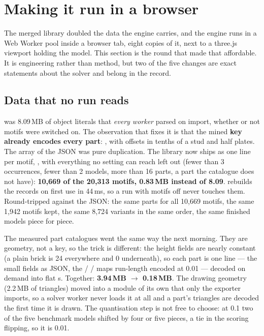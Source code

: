 \section{Making it run in a browser}\label{sec:fast}
The merged library doubled the data the engine carries, and the engine runs in a Web Worker pool inside a browser tab, eight
copies of it, next to a three.js viewport holding the model. This section is the round that made that affordable. It is
engineering rather than method, but two of the five changes are exact statements about the solver and belong in the record.

\subsection{Data that no run reads}
 was 8.09\,MB of object literals that \emph{every worker} parsed on import, whether or not motifs were switched on.
The observation that fixes it is that the mined \textbf{key already encodes every part}: , with
offsets in tenths of a stud and half plates. The  array of the JSON was pure duplication. The library now ships as one
line per motif, , with everything no setting can reach left out (fewer than 3
occurrences, fewer than 2 models, more than 16 parts, a part the catalogue does not have): \textbf{10,669 of the 20,313 motifs,
0.83\,MB instead of 8.09}.  rebuilds the records on first use in 44\,ms, so a run with motifs off never touches
them. Round-tripped against the JSON: the same parts for all 10,669 motifs, the same 1,942 motifs kept, the same 8,724 variants in
the same order, the same finished models piece for piece.

The measured part catalogues went the same way the next morning. They are geometry, not a key, so the trick is different: the
height fields are nearly constant (a plain brick is 24\ldu{} everywhere and 0 underneath), so each part is one line --- the small
fields as JSON, the  /  /  maps run-length encoded at 0.01\ldu{} --- decoded on demand into flat
s. Together: \textbf{3.94\,MB $\to$ 0.18\,MB}. The drawing geometry (2.2\,MB of triangles) moved into a module of
its own that only the exporter imports, so a solver worker never loads it at all and a part's triangles are decoded the first time
it is drawn. The quantisation step is not free to choose: at 0.1\ldu{} two of the five benchmark models shifted by four or five
pieces, a tie in the scoring flipping, so it is 0.01.

